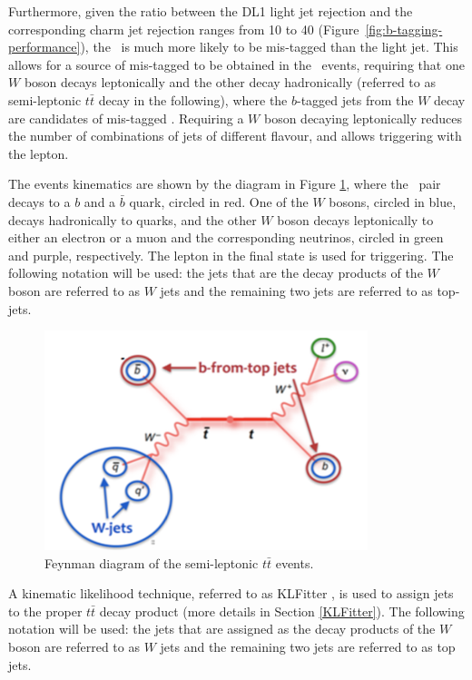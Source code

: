 \documentclass[letterpaper,12pt]{article}
\begin{document}
Furthermore, given the ratio between the DL1 light jet rejection and the corresponding charm jet rejection 
ranges from 10 to 40 (Figure~\ref{fig:b-tagging-performance}), the 
\cjet\ is much more likely to be mis-tagged than the light jet. 
This allows for a source of mis-tagged \cjets to be obtained in the \ttbar\ events, 
requiring that one $W$ boson decays leptonically and the other decay hadronically 
(referred to as semi-leptonic $t\bar{t}$ decay in the following),
where the $b$-tagged jets from the $W$ decay are candidates of mis-tagged \cjets.
Requiring a $W$ boson decaying leptonically 
reduces the number of combinations of jets of different flavour, 
and allows triggering with the lepton.

The events kinematics are shown by the diagram in 
Figure \ref{fig:feynman}, where the \ttbar\ pair decays to a 
$b$ and a $\bar{b}$ quark, circled in red. One of the $W$ bosons, 
circled in blue, decays hadronically to quarks, 
and the other $W$ boson decays leptonically to either 
an electron or a muon and the corresponding neutrinos, 
circled in green and purple, respectively. 
The lepton in the final state is used for triggering.
The following notation will be used: the jets that are
the decay products of the $W$ boson are referred to as
$W$ jets and the remaining two jets are referred to as top-jets.

\begin{figure}[H]
\centering
\includegraphics[width=.45\textwidth]{FTAG_plots/feynman.png}
\caption{Feynman diagram of the semi-leptonic $t\bar{t}$ events.}
\label{fig:feynman}
\end{figure}


A kinematic likelihood technique, referred to as 
KLFitter \cite{ERDMANN201418}, is used to assign jets to the proper $t\bar{t}$ decay product 
(more details in Section \ref{KLFitter}). 
The following notation will be used: the jets that are
assigned as the decay products of the $W$ boson are referred to as
$W$ jets and the remaining two jets are referred to as top jets.
\end{document}
